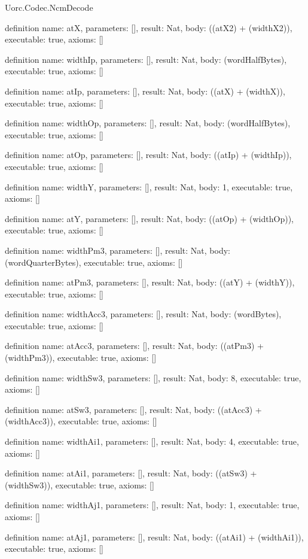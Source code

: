 \begin{lexlean}{Uorc.Codec.NcmDecode}
\begin{semanticmodule}
definition{
  name: atX,
  parameters: [],
  result: Nat,
  body: ((atX2) + (widthX2)),
  executable: true,
  axioms: []
}

definition{
  name: widthIp,
  parameters: [],
  result: Nat,
  body: (wordHalfBytes),
  executable: true,
  axioms: []
}

definition{
  name: atIp,
  parameters: [],
  result: Nat,
  body: ((atX) + (widthX)),
  executable: true,
  axioms: []
}

definition{
  name: widthOp,
  parameters: [],
  result: Nat,
  body: (wordHalfBytes),
  executable: true,
  axioms: []
}

definition{
  name: atOp,
  parameters: [],
  result: Nat,
  body: ((atIp) + (widthIp)),
  executable: true,
  axioms: []
}

definition{
  name: widthY,
  parameters: [],
  result: Nat,
  body: 1,
  executable: true,
  axioms: []
}

definition{
  name: atY,
  parameters: [],
  result: Nat,
  body: ((atOp) + (widthOp)),
  executable: true,
  axioms: []
}

definition{
  name: widthPm3,
  parameters: [],
  result: Nat,
  body: (wordQuarterBytes),
  executable: true,
  axioms: []
}

definition{
  name: atPm3,
  parameters: [],
  result: Nat,
  body: ((atY) + (widthY)),
  executable: true,
  axioms: []
}

definition{
  name: widthAcc3,
  parameters: [],
  result: Nat,
  body: (wordBytes),
  executable: true,
  axioms: []
}

definition{
  name: atAcc3,
  parameters: [],
  result: Nat,
  body: ((atPm3) + (widthPm3)),
  executable: true,
  axioms: []
}

definition{
  name: widthSw3,
  parameters: [],
  result: Nat,
  body: 8,
  executable: true,
  axioms: []
}

definition{
  name: atSw3,
  parameters: [],
  result: Nat,
  body: ((atAcc3) + (widthAcc3)),
  executable: true,
  axioms: []
}

definition{
  name: widthAi1,
  parameters: [],
  result: Nat,
  body: 4,
  executable: true,
  axioms: []
}

definition{
  name: atAi1,
  parameters: [],
  result: Nat,
  body: ((atSw3) + (widthSw3)),
  executable: true,
  axioms: []
}

definition{
  name: widthAj1,
  parameters: [],
  result: Nat,
  body: 1,
  executable: true,
  axioms: []
}

definition{
  name: atAj1,
  parameters: [],
  result: Nat,
  body: ((atAi1) + (widthAi1)),
  executable: true,
  axioms: []
}


\end{semanticmodule}
\end{lexlean}
